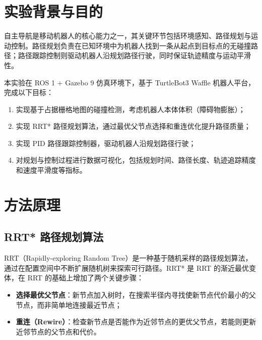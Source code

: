 \documentclass{SYSUReport}
\date{2026年6月4日}
\begin{document}
\cover
\thispagestyle{empty}
\clearpage

\setcounter{page}{1}
\tableofcontents
\clearpage

\setcounter{page}{1}

\section{实验背景与目的}

自主导航是移动机器人的核心能力之一，其关键环节包括环境感知、路径规划与运动控制。路径规划负责在已知环境中为机器人找到一条从起点到目标点的无碰撞路径；路径跟踪控制则驱动机器人沿规划路径行驶，同时保证轨迹精度与运动平滑性。

本实验在 ROS 1 + Gazebo 9 仿真环境下，基于 TurtleBot3 Waffle 机器人平台，完成以下目标：

\begin{enumerate}
    \item 实现基于占据栅格地图的碰撞检测，考虑机器人本体体积（障碍物膨胀）；
    \item 实现 RRT* 路径规划算法，通过最优父节点选择和重连优化提升路径质量；
    \item 实现 PID 路径跟踪控制器，驱动机器人沿规划路径行驶；
    \item 对规划与控制过程进行数据可视化，包括规划时间、路径长度、轨迹追踪精度和速度平滑度等指标。
\end{enumerate}

\section{方法原理}

\subsection{RRT* 路径规划算法}

RRT（Rapidly-exploring Random Tree）是一种基于随机采样的路径规划算法，通过在配置空间中不断扩展随机树来探索可行路径。RRT* 是 RRT 的渐近最优变体，在 RRT 的基础上增加了两个关键步骤：

\begin{itemize}
    \item \textbf{选择最优父节点}：新节点加入树时，在搜索半径内寻找使新节点代价最小的父节点，而非简单地连接最近节点；
    \item \textbf{重连（Rewire）}：检查新节点是否能作为近邻节点的更优父节点，若能则更新近邻节点的父节点和代价。
\end{itemize}
\end{document}
